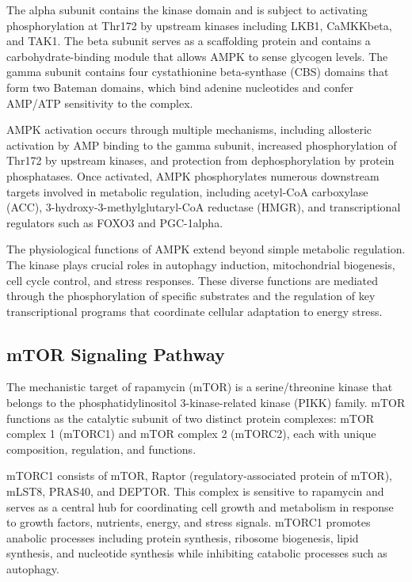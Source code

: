 \documentclass[11
pt,a4paper]{article}
\begin{document}


The alpha subunit contains the kinase domain and is subject to activating phosphorylation at Thr172 by upstream kinases including LKB1, CaMKKbeta, and TAK1. The beta subunit serves as a scaffolding protein and contains a carbohydrate-binding module that allows AMPK to sense glycogen levels. The gamma subunit contains four cystathionine beta-synthase (CBS) domains that form two Bateman domains, which bind adenine nucleotides and confer AMP/ATP sensitivity to the complex.

AMPK activation occurs through multiple mechanisms, including allosteric activation by AMP binding to the gamma subunit, increased phosphorylation of Thr172 by upstream kinases, and protection from dephosphorylation by protein phosphatases. Once activated, AMPK phosphorylates numerous downstream targets involved in metabolic regulation, including acetyl-CoA carboxylase (ACC), 3-hydroxy-3-methylglutaryl-CoA reductase (HMGR), and transcriptional regulators such as FOXO3 and PGC-1alpha.

The physiological functions of AMPK extend beyond simple metabolic regulation. The kinase plays crucial roles in autophagy induction, mitochondrial biogenesis, cell cycle control, and stress responses. These diverse functions are mediated through the phosphorylation of specific substrates and the regulation of key transcriptional programs that coordinate cellular adaptation to energy stress.

\subsection{mTOR Signaling Pathway}

The mechanistic target of rapamycin (mTOR) is a serine/threonine kinase that belongs to the phosphatidylinositol 3-kinase-related kinase (PIKK) family. mTOR functions as the catalytic subunit of two distinct protein complexes: mTOR complex 1 (mTORC1) and mTOR complex 2 (mTORC2), each with unique composition, regulation, and functions.

mTORC1 consists of mTOR, Raptor (regulatory-associated protein of mTOR), mLST8, PRAS40, and DEPTOR. This complex is sensitive to rapamycin and serves as a central hub for coordinating cell growth and metabolism in response to growth factors, nutrients, energy, and stress signals. mTORC1 promotes anabolic processes including protein synthesis, ribosome biogenesis, lipid synthesis, and nucleotide synthesis while inhibiting catabolic processes such as autophagy.
\end{document}
